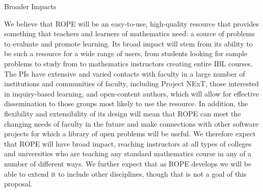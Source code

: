 \documentclass[11pt]{article}
\begin{document}


\begin{section}{Broader Impacts}

We believe that ROPE will be an easy-to-use, high-quality resource that
provides something that teachers and learners of mathematics need: a
source of problems to evaluate and promote learning.  Its broad impact
will stem from its ability to be such a resource for a wide range of
users, from students looking for sample problems to study from to
mathematics instructors creating entire IBL courses.  The PIs have
extensive and varied contacts with faculty 
in a large number of institutions and communities of faculty,
including Project NExT, those interested in inquiry-based learning, and
open-content authors, which will allow for effective dissemination to those 
groups most likely to use the resource.  
In addition, the flexibility and
extensibility of its design will mean that ROPE can meet the changing
needs of faculty in the future and make connections with other software
projects for which a library of open problems will be useful.  We
therefore expect that ROPE will have broad impact, reaching instructors at
all types of colleges and universities who are teaching any standard
mathematics course in any of a number of different ways.  We further
expect that as ROPE develops we will be able to extend it to include other
disciplines, though that is not a goal of this proposal.
\end{section}
\end{document}
